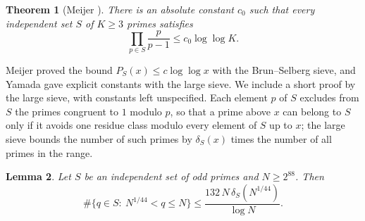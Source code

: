 \documentclass[11pt,reqno]{amsart}
\numberwithin{equation}{section}
\theoremstyle{plain}
\newtheorem{theorem}{Theorem}[section]
\newtheorem{lemma}[theorem]{Lemma}
\theoremstyle{definition}
\theoremstyle{remark}
\begin{document}
\begin{theorem}[Meijer \cite{Mei74}]\label{thm:sieve}
There is an absolute constant $c_0$ such that every independent set
$S$ of $K\ge3$ primes satisfies
\[
  \prod_{p\in S}\frac p{p-1}\le c_0\log\log K .
\]
\end{theorem}

Meijer proved the bound $P_S(x)\le c\log\log x$ with the
Brun--Selberg sieve, and Yamada \cite{Yam23} gave explicit constants
with the large sieve. We include a short proof by the large sieve,
with constants left unspecified. Each element $p$ of $S$ excludes
from $S$ the primes congruent to $1$ modulo $p$, so that a prime above
$x$ can belong to $S$ only if it avoids one residue class modulo every
element of $S$ up to $x$; the large sieve bounds the number of such
primes by $\delta_S(x)$ times the number of all primes in the range.

\begin{lemma}\label{lem:sievestep}
Let $S$ be an independent set of odd primes and $N\ge2^{88}$. Then
\[
  \#\{q\in S:\ N^{1/44}<q\le N\}\le\frac{132\,N\,\delta_S(N^{1/44})}{\log N}.
\]
\end{lemma}
\end{document}
